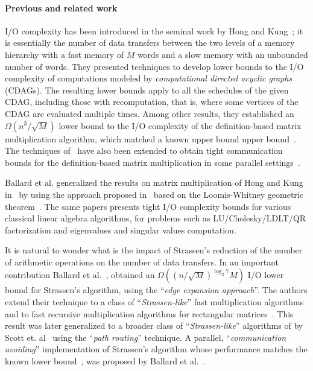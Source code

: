 \documentclass[a4paper,UKenglish]{lipics-v2016}
\newcommand{\BOme}[1]{\Omega\left(#1\right)}
\newcommand{\io }{I/O }
\begin{document}
\paragraph*{Previous and related work}

\io complexity has been introduced in the seminal work by Hong and
Kung~\cite{jia1981complexity}; it is essentially the number of data
transfers between the two levels of a memory hierarchy with a fast
memory of $M$ words and a slow memory with an unbounded number of
words. They presented techniques to develop lower bounds to the \io
complexity of computations modeled by \emph{computational directed acyclic graphs} (CDAGs). The resulting lower bounds
apply to all the schedules of the given CDAG, including those with
recomputation, that is, where some vertices of the CDAG are evaluated
multiple times. Among other results, they established an $\BOme{n^3/
  \sqrt{M}}$ lower bound to the \io complexity of the definition-based
matrix multiplication algorithm, which matched a known upper bound
upper bound~\cite{cannon1969cellular}. The techniques
of~\cite{jia1981complexity} have also been extended to obtain tight
communication bounds for the definition-based matrix multiplication in
some parallel settings~\cite{irony2004communication,frigo1999cache}.

Ballard et al.  generalized the results on matrix multiplication of
Hong and Kung~\cite{jia1981complexity} in~\cite{ballard2011minimizing,
  ballard2010communication} by using the approach proposed
in~\cite{irony2004communication} based on the Loomis-Whitney geometric
theorem~\cite{loomis1949,zalg}. The same papers presents tight \io
complexity bounds for various classical linear algebra algorithms, for
problems such as LU/Cholesky/LDLT/QR factorization and eigenvalues and
singular values computation. 


It is natural to wonder what is the impact of Strassen's reduction of
the number of arithmetic operations on the number of data transfers.
In an important contribution Ballard et
al.~\cite{ballard2012graph}, obtained an
$\Omega((n/\sqrt{M})^{\log_2 7}M)$ \io lower bound for Strassen's
algorithm, using the ``\emph{edge expansion approach}''. The authors
extend their technique to a class of ``\emph{Strassen-like}'' fast
multiplication algorithms and to fast recursive multiplication
algorithms for rectangular matrices~\cite{ballard2012graphrec}. This
result was later generalized to a broader class of
``\emph{Strassen-like}'' algorithms of by Scott
et. al~\cite{scott2015matrix} using the ``\emph{path routing}''
technique.  A parallel, ``\emph{communication avoiding}''
implementation of Strassen's algorithm whose performance matches the
known lower bound~\cite{ballard2012graph,scott2015matrix}, was
proposed by Ballard et al.~\cite{ballard2012communicationalg}.
\end{document}
